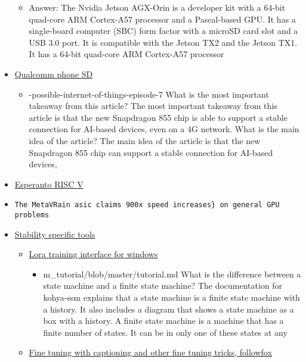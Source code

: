 \begin{itemize}
  \begin{itemize}
  \tightlist
  \item
    Answer: The Nvidia Jetson AGX-Orin is a developer kit with a 64-bit
    quad-core ARM Cortex-A57 processor and a Pascal-based GPU. It has a
    single-board computer (SBC) form factor with a microSD card slot and
    a USB 3.0 port. It is compatible with the Jetson TX2 and the Jetson
    TX1. It has a 64-bit quad-core ARM Cortex-A57 processor
  \end{itemize}
\item
  \href{https://www.theverge.com/2023/2/23/23611668/ai-image-stable-diffusion-mobile-android-qualcomm-fastest}{Qualcomm
  phone SD}

  \begin{itemize}
  \tightlist
  \item
    -possible-internet-of-things-episode-7 What is the most important
    takeaway from this article? The most important takeaway from this
    article is that the new Snapdragon 855 chip is able to support a
    stable connection for AI-based devices, even on a 4G network. What
    is the main idea of the article? The main idea of the article is
    that the new Snapdragon 855 chip can support a stable connection for
    AI-based devices,
  \end{itemize}
\item
  \href{https://www.esperanto.ai/}{Esperanto RISC V}
\item
  \href{https://hdh4797.wixsite.com/dhan/project-1}{}

\begin{verbatim}
The MetaVRain asic claims 900x speed increases} on general GPU problems
\end{verbatim}
\item
  \href{https://sdtools.org/}{Stability specific tools}

  \begin{itemize}
  \item
    \href{https://github.com/bmaltais/kohya_ss}{Lora training interface
    for windows}

    \begin{itemize}
    \tightlist
    \item
      m\_tutorial/blob/master/tutorial.md What is the difference between
      a state machine and a finite state machine? The documentation for
      kohya-ssm explains that a state machine is a finite state machine
      with a history. It also includes a diagram that shows a state
      machine as a box with a history. A finite state machine is a
      machine that has a finite number of states. It can be in only one
      of these states at any
    \end{itemize}
  \item
    \href{https://substack.com/profile/110613456-followfoxai}{Fine
    tuning with captioning and other fine tuning tricks, followfox}


\end{itemize}
\end{itemize}
